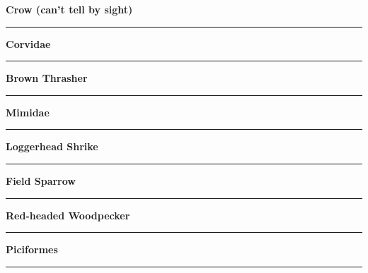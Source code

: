 \documentclass[11pt]{exam}
\newcommand*\Matching[1]{
\ifprintanswers
	\textbf{#1}
\else
	\rule{2.5in}{0.4pt}
\fi
}
\newlength\matchlena
\newlength\matchlenb
\newcommand\MatchQuestion[2]{%
	\setlength\matchlenb{\linewidth}
	\addtolength\matchlenb{-\matchlena}
	\parbox[t]{\matchlena}{\Matching{#1}}\enspace\parbox[t]{\matchlenb}{#2}}
\begin{document}
\begin{questions}
\begin{multicols}{2}
\question\MatchQuestion{Crow (can't tell by sight)}{}
\vspace{2\baselineskip}

\question\MatchQuestion{Corvidae}{}
\vspace{2\baselineskip}

\question\MatchQuestion{Brown Thrasher}{}
\vspace{2\baselineskip}

\question\MatchQuestion{Mimidae}{}
\vspace{2\baselineskip}

\question\MatchQuestion{Loggerhead Shrike}{}
\vspace{2\baselineskip}

\question\MatchQuestion{Field Sparrow}{}
\vspace{2\baselineskip}

\question\MatchQuestion{Red-headed Woodpecker}{}
\vspace{2\baselineskip}

\question\MatchQuestion{Piciformes}{}
\vspace{2\baselineskip}


\end{multicols}
\end{questions}
\end{document}
